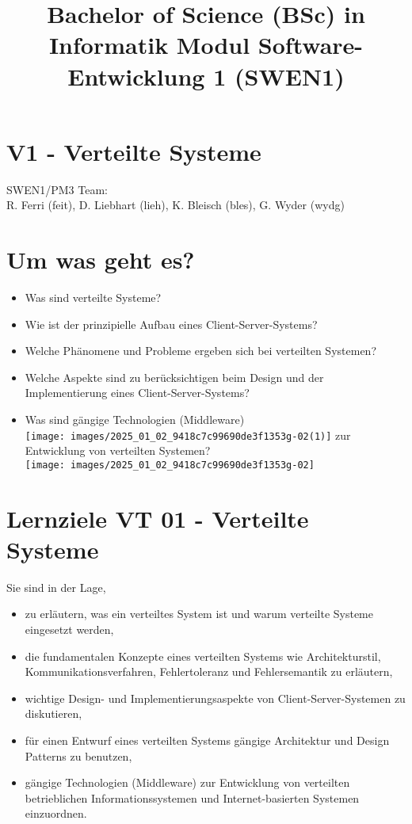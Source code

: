 \documentclass[10pt]{article}
\title{Bachelor of Science (BSc) in Informatik Modul Software-Entwicklung 1 (SWEN1) }
\author{}
\date{}
\begin{document}
\maketitle
\section*{V1 - Verteilte Systeme}
SWEN1/PM3 Team:\\
R. Ferri (feit), D. Liebhart (lieh), K. Bleisch (bles), G. Wyder (wydg)

\section*{Um was geht es?}
\begin{itemize}
  \item Was sind verteilte Systeme?
  \item Wie ist der prinzipielle Aufbau eines Client-Server-Systems?
  \item Welche Phänomene und Probleme ergeben sich bei verteilten Systemen?
  \item Welche Aspekte sind zu berücksichtigen beim Design und der Implementierung eines Client-Server-Systems?
  \item Was sind gängige Technologien (Middleware)\\
\texttt{[image: images/2025\_01\_02\_9418c7c99690de3f1353g-02(1)]} zur Entwicklung von verteilten Systemen?\\
\texttt{[image: images/2025\_01\_02\_9418c7c99690de3f1353g-02]}
\end{itemize}

\section*{Lernziele VT 01 - Verteilte Systeme}
Sie sind in der Lage,

\begin{itemize}
  \item zu erläutern, was ein verteiltes System ist und warum verteilte Systeme eingesetzt werden,
  \item die fundamentalen Konzepte eines verteilten Systems wie Architekturstil, Kommunikationsverfahren, Fehlertoleranz und Fehlersemantik zu erläutern,
  \item wichtige Design- und Implementierungsaspekte von Client-Server-Systemen zu diskutieren,
  \item für einen Entwurf eines verteilten Systems gängige Architektur und Design Patterns zu benutzen,
  \item gängige Technologien (Middleware) zur Entwicklung von verteilten betrieblichen Informationssystemen und Internet-basierten Systemen einzuordnen.
\end{itemize}
\end{document}
